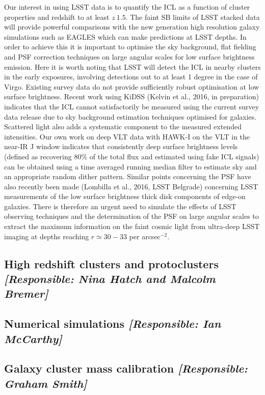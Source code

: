 \documentclass[a4paper,11pt]{article}
\begin{document}
Our interest in using LSST data is to quantify the ICL as a function
of cluster properties and redshift to at least $z~1.5$. The faint SB
limits of LSST stacked data will provide powerful comparisons with the
new generation high resolution galaxy simulations such as EAGLES which
can make predictions at LSST depths. In order to achieve this it is
important to optimise the sky background, flat fielding and PSF
correction techniques on large angular scales for low surface
brightness emission. Here it is worth noting that LSST will detect the
ICL in nearby clusters in the early exposures, involving detections
out to at least 1 degree in the case of Virgo. Existing survey data do
not provide sufficiently robust optimisation at low surface
brightness. Recent work using KiDSS (Kelvin et al., 2016, in
preparation) indicates that the ICL cannot satisfactorily be measured
using the current survey data release due to sky background estimation
techniques optimised for galaxies. Scattered light also adds a
systematic component to the measured extended intensities. Our own
work on deep VLT data with HAWK-I on the VLT in the near-IR J window
indicates that consistently deep surface brightness levels (defined as
recovering $80\%$ of the total flux and estimated using fake ICL
signals) can be obtained using a time averaged running median filter
to estimate sky and an appropriate random dither pattern. Similar
points concerning the PSF have also recently been made (Lombilla et
al., 2016, LSST Belgrade) concerning LSST measurements of the low
surface brightness thick disk components of edge-on galaxies. There is
therefore an urgent need to simulate the effects of LSST observing
techniques and the determination of the PSF on large angular scales to
extract the maximum information on the faint cosmic light from
ultra-deep LSST imaging at depths reaching $r \simeq 30-33$ per
arcsec$^{-2}$.

\subsection{High redshift clusters and protoclusters {\it [Responsible: Nina Hatch and Malcolm Bremer]}}

\subsection{Numerical simulations {\it [Responsible: Ian McCarthy]}}

\subsection{Galaxy cluster mass calibration {\it [Responsible: Graham Smith]}}
\end{document}
